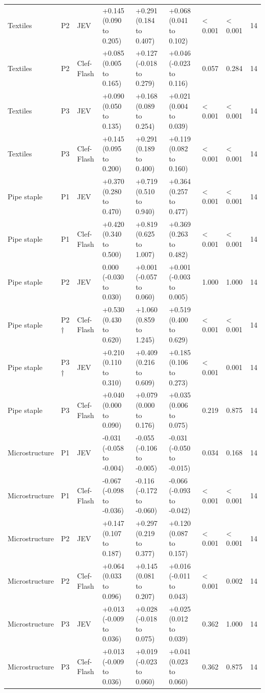 \begin{table}
\begin{tabular}[t]{llllllllr}
Textiles & P2 & JEV & +0.145 (0.090 to 0.205) & +0.291 (0.184 to 0.407) & +0.068 (0.041 to 0.102) & < 0.001 & < 0.001 & 14\\
Textiles & P2 & Clef-Flash & +0.085 (0.005 to 0.165) & +0.127 (-0.018 to 0.279) & +0.046 (-0.023 to 0.116) & 0.057 & 0.284 & 14\\
Textiles & P3 & JEV & +0.090 (0.050 to 0.135) & +0.168 (0.089 to 0.254) & +0.021 (0.004 to 0.039) & < 0.001 & < 0.001 & 14\\
\addlinespace
Textiles & P3 & Clef-Flash & +0.145 (0.095 to 0.200) & +0.291 (0.189 to 0.400) & +0.119 (0.082 to 0.160) & < 0.001 & < 0.001 & 14\\
Pipe staple & P1 & JEV & +0.370 (0.280 to 0.470) & +0.719 (0.510 to 0.940) & +0.364 (0.257 to 0.477) & < 0.001 & < 0.001 & 14\\
Pipe staple & P1 & Clef-Flash & +0.420 (0.340 to 0.500) & +0.819 (0.625 to 1.007) & +0.369 (0.263 to 0.482) & < 0.001 & < 0.001 & 14\\
Pipe staple & P2 & JEV & 0.000 (-0.030 to 0.030) & +0.001 (-0.057 to 0.060) & +0.001 (-0.003 to 0.005) & 1.000 & 1.000 & 14\\
Pipe staple & P2 † & Clef-Flash & +0.530 (0.430 to 0.620) & +1.060 (0.859 to 1.245) & +0.519 (0.400 to 0.629) & < 0.001 & < 0.001 & 14\\
\addlinespace
Pipe staple & P3 † & JEV & +0.210 (0.110 to 0.310) & +0.409 (0.216 to 0.609) & +0.185 (0.106 to 0.273) & < 0.001 & 0.001 & 14\\
Pipe staple & P3 & Clef-Flash & +0.040 (0.000 to 0.090) & +0.079 (0.000 to 0.176) & +0.035 (0.006 to 0.075) & 0.219 & 0.875 & 14\\
Microstructure & P1 & JEV & -0.031 (-0.058 to -0.004) & -0.055 (-0.106 to -0.005) & -0.031 (-0.050 to -0.015) & 0.034 & 0.168 & 14\\
Microstructure & P1 & Clef-Flash & -0.067 (-0.098 to -0.036) & -0.116 (-0.172 to -0.060) & -0.066 (-0.093 to -0.042) & < 0.001 & < 0.001 & 14\\
Microstructure & P2 & JEV & +0.147 (0.107 to 0.187) & +0.297 (0.219 to 0.377) & +0.120 (0.087 to 0.157) & < 0.001 & < 0.001 & 14\\
\addlinespace
Microstructure & P2 & Clef-Flash & +0.064 (0.033 to 0.096) & +0.145 (0.081 to 0.207) & +0.016 (-0.011 to 0.043) & < 0.001 & 0.002 & 14\\
Microstructure & P3 & JEV & +0.013 (-0.009 to 0.036) & +0.028 (-0.018 to 0.075) & +0.025 (0.012 to 0.039) & 0.362 & 1.000 & 14\\
Microstructure & P3 & Clef-Flash & +0.013 (-0.009 to 0.036) & +0.019 (-0.023 to 0.060) & +0.041 (0.023 to 0.060) & 0.362 & 0.875 & 14\\
\bottomrule
\end{tabular}
\end{table}
